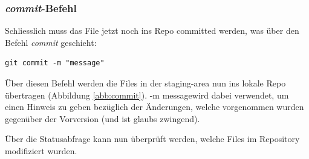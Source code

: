 \documentclass[twoside, 11pr]{article}
\begin{document}
\begin{figure}[!tbph]
\end{figure}


\subsubsection{\textit{commit}-Befehl} \label{ch:commit}

Schliesslich muss das File jetzt noch ins Repo committed werden, was über den Befehl \textit{commit} geschieht:

\begin{lstlisting}
git commit -m "message"
\end{lstlisting}

Über diesen Befehl werden die Files in der staging-area nun ins lokale Repo übertragen (Abbildung \ref{abb:commit}). -m \glqq message\grqq wird dabei verwendet, um einen Hinweis zu geben bezüglich der Änderungen, welche vorgenommen wurden gegenüber der Vorversion (und ist glaubs zwingend).\newline
\par
\noindent
Über die Statusabfrage kann nun überprüft werden, welche Files im Repository modifiziert wurden.
\end{document}
